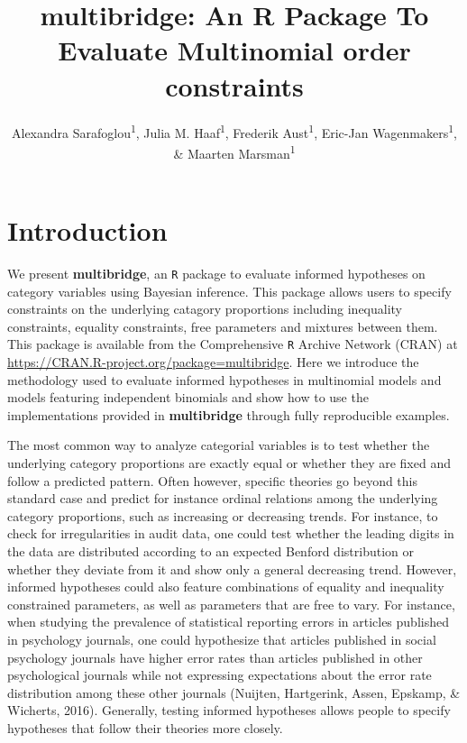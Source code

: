 \documentclass[
  english,
  man,floatsintext]{apa6}
\author{Alexandra Sarafoglou\textsuperscript{1}, Julia M. Haaf\textsuperscript{1}, Frederik Aust\textsuperscript{1}, Eric-Jan Wagenmakers\textsuperscript{1}, \& Maarten Marsman\textsuperscript{1}}
\affiliation{
\vspace{0.5cm}
\textsuperscript{1} University of Amsterdam}
\title{multibridge: An R Package To Evaluate Multinomial order constraints}
\date{}
\begin{document}
\maketitle

\hypertarget{introduction}{%
\section{Introduction}\label{introduction}}

We present \textbf{multibridge}, an \texttt{R} package to evaluate informed hypotheses on category variables using Bayesian inference. This package allows users to specify constraints on the underlying catagory proportions including inequality constraints, equality constraints, free parameters and mixtures between them. This package is available from the Comprehensive \texttt{R} Archive Network (CRAN) at \url{https://CRAN.R-project.org/package=multibridge}. Here we introduce the methodology used to evaluate informed hypotheses in multinomial models and models featuring independent binomials and show how to use the implementations provided in \textbf{multibridge} through fully reproducible examples.

The most common way to analyze categorial variables is to test whether the underlying category proportions are exactly equal or whether they are fixed and follow a predicted pattern. Often however, specific theories go beyond this standard case and predict for instance ordinal relations among the underlying category proportions, such as increasing or decreasing trends. For instance, to check for irregularities in audit data, one could test whether the leading digits in the data are distributed according to an expected Benford distribution or whether they deviate from it and show only a general decreasing trend. However, informed hypotheses could also feature combinations of equality and inequality constrained parameters, as well as parameters that are free to vary. For instance, when studying the prevalence of statistical reporting errors in articles published in psychology journals, one could hypothesize that articles published in social psychology journals have higher error rates than articles published in other psychological journals while not expressing expectations about the error rate distribution among these other journals (Nuijten, Hartgerink, Assen, Epskamp, \& Wicherts, 2016). Generally, testing informed hypotheses allows people to specify hypotheses that follow their theories more closely.
\end{document}
